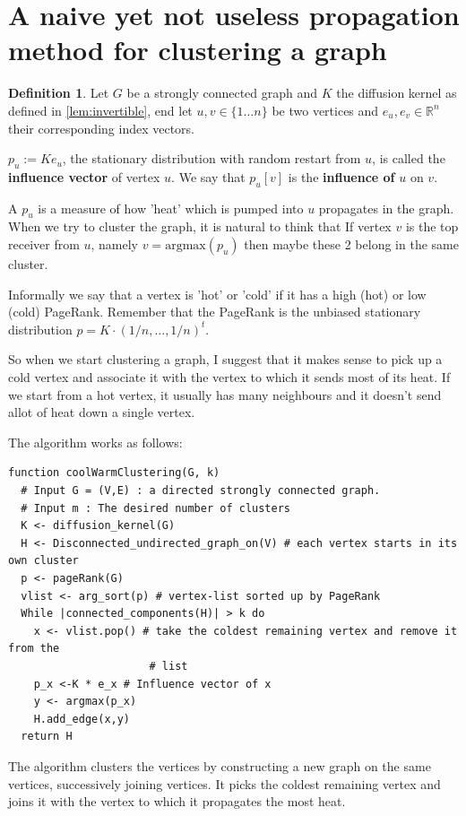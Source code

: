 \documentclass[a4paper,10pt]{article}
\newcommand{\R}{\mathbb{R}}
\theoremstyle{definition}
\newtheorem{mydef}{Definition}[section]
\theoremstyle{remark}
\theoremstyle{plain}
\begin{document}
\section{A naive yet not useless propagation method for clustering a graph}

\begin{mydef}
\label{def:influence}
Let $G$ be a strongly connected graph and $K$ the diffusion kernel as defined in
\ref{lem:invertible}, end let $u,v \in \{1 \dots n\}$ be two vertices and $e_u,
e_v \in \R^n$ their corresponding index vectors.

$p_u := K e_u$, the stationary distribution with random restart from $u$,
is called the \textbf{influence vector} of vertex $u$. We say that $p_u[v]$
is the \textbf{influence of} $u$ on $v$.
\end{mydef}

A $p_u$ is a measure of how 'heat' which is pumped into $u$ propagates in the graph.
When we try to cluster the graph, it is natural to think that If vertex $v$
is the top receiver from $u$, namely $v = \text{argmax}(p_u)$ then maybe these 2
belong in the same cluster.

Informally we say that a vertex is 'hot' or 'cold' if it has a high (hot) or low
(cold) PageRank. Remember that the PageRank is the unbiased stationary distribution
$p = K \cdot (1/n, \dots, 1/n)^t$.

So when we start clustering a graph, I suggest that it makes sense to pick up a
cold vertex and associate it with the vertex to which it sends most of its heat.
If we start from a hot vertex, it usually has many neighbours and it doesn't
send allot of heat down a single vertex.

The algorithm works as follows:

\begin{lstlisting}
function coolWarmClustering(G, k)
  # Input G = (V,E) : a directed strongly connected graph.
  # Input m : The desired number of clusters
  K <- diffusion_kernel(G)
  H <- Disconnected_undirected_graph_on(V) # each vertex starts in its own cluster 
  p <- pageRank(G)
  vlist <- arg_sort(p) # vertex-list sorted up by PageRank 
  While |connected_components(H)| > k do
    x <- vlist.pop() # take the coldest remaining vertex and remove it from the
                      # list
    p_x <-K * e_x # Influence vector of x
    y <- argmax(p_x)
    H.add_edge(x,y)
  return H
\end{lstlisting}

The algorithm clusters the vertices by constructing a new graph on the same
vertices, successively joining vertices. It picks the coldest remaining vertex
and joins it with the vertex to which it propagates the most heat.
\end{document}
